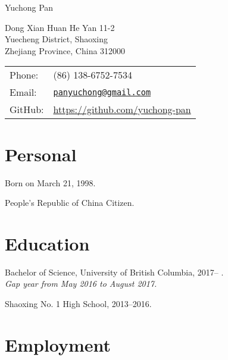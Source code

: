 \documentclass[letterpaper]{article}
\def\name{Yuchong Pan}
\renewenvironment{itemize}{
  \begin{list}{}{
    \setlength{\leftmargin}{1.5em}
  }
}{
  \end{list}
}
\begin{document}
{\huge \name}


\vspace{0.25in}

\begin{minipage}{0.45\linewidth}
  Dong Xian Huan He Yan 11-2 \\
  Yuecheng District, Shaoxing \\
  Zhejiang Province, China 312000
\end{minipage}
\begin{minipage}{0.45\linewidth}
  \begin{tabular}{ll}
    Phone: & (86) 138-6752-7534 \\
    Email: & \href{mailto:panyuchong@gmail.com}{\tt panyuchong@gmail.com} \\
    GitHub: & \url{https://github.com/yuchong-pan}
  \end{tabular}
\end{minipage}


\section*{Personal}

\begin{itemize}
    \item Born on March 21, 1998.

    \item People's Republic of China Citizen.
\end{itemize}


\section*{Education}

\begin{itemize}
  \item Bachelor of Science, University of British Columbia, 2017-- .\\
  \emph{Gap year from May 2016 to August 2017.}

  \item Shaoxing No. 1 High School, 2013--2016.
\end{itemize}


\section*{Employment}
\end{document}
